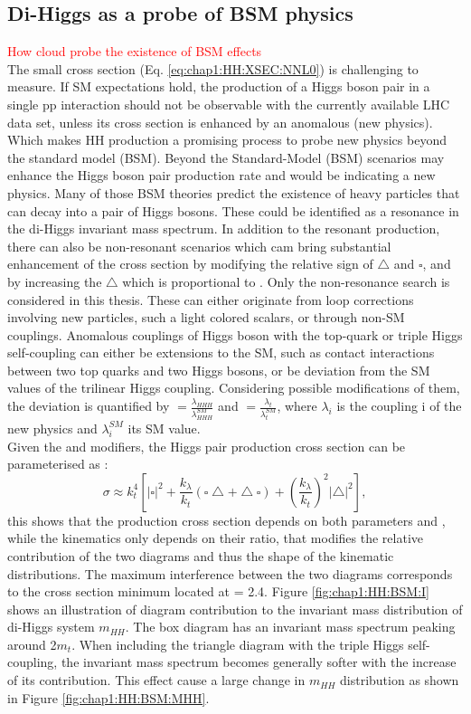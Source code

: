 \subsection{Di-Higgs as a probe of BSM physics}
\label{chap1:HH:BSM}
\textcolor{red}{How \kl cloud probe the existence of BSM effects} \\
The small cross section (Eq. \ref{eq:chap1:HH:XSEC:NNL0}) is challenging to measure. If SM expectations hold, the production of a Higgs boson pair in a single pp interaction should not be observable with the currently available LHC data set, unless its cross section is enhanced by an anomalous (new physics). Which makes HH production a promising process to probe new physics beyond the standard model (BSM). Beyond the Standard-Model (BSM) scenarios may enhance the Higgs boson pair production rate and would be indicating a new physics. Many of those BSM theories predict the existence of heavy particles that can decay into a pair of Higgs bosons. These could be identified as a resonance in the di-Higgs invariant mass spectrum. In addition to the resonant production, there can also be non-resonant scenarios which cam bring substantial enhancement of the cross section by modifying the relative sign of $\bigtriangleup$ and $\square$, and by increasing the $\bigtriangleup$ which is proportional to \kl. Only the non-resonance search is considered in this thesis. These can either originate from loop corrections involving new particles, such a light colored scalars, or through non-SM couplings. Anomalous couplings of Higgs boson with the top-quark or triple Higgs self-coupling can either be extensions to the SM, such as contact interactions between two top quarks and two Higgs bosons, or be deviation from the SM values of the trilinear Higgs coupling. Considering possible modifications of them, the deviation is quantified by \kl $ = \frac{\lambda_{HHH}}{\lambda_{HHH}^{SM}}$ and \kt $= \frac{\lambda_{t}}{\lambda_{t}^{SM}}$, where $\lambda_{i}$ is the coupling i of the new physics and $\lambda_{i}^{SM}$ its SM value. \\
Given the \kt and \kl modifiers, the Higgs pair production cross section can be parameterised as :
\begin{equation}
  \sigma \approx k_{t}^{4}\left[|\square|^{2}+\frac{k_{\lambda}}{k_{t}}(\square\bigtriangleup+\bigtriangleup \square)+\left(\frac{k_{\lambda}}{k_{t}}\right)^{2}|\bigtriangleup|^{2}\right], 
\end{equation}
this shows that the production cross section depends on both parameters \kt and \kl, while the kinematics only depends on their ratio, that modifies the relative contribution of the two diagrams and thus the shape of the kinematic distributions. The maximum interference between the two diagrams corresponds to the cross section minimum located at \kl = 2.4\kt. Figure \ref{fig:chap1:HH:BSM:I} shows an illustration of diagram contribution to the invariant mass distribution of di-Higgs system $m_{HH}$. The box diagram has an invariant mass spectrum peaking around 2$m_t$. When including the triangle diagram with the triple Higgs self-coupling, the invariant mass spectrum becomes generally softer with the increase of its contribution. This effect cause a large change in $m_{HH}$ distribution as shown in Figure \ref{fig:chap1:HH:BSM:MHH}.

